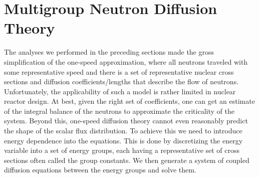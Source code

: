 \section{Multigroup Neutron Diffusion Theory}

The analyses we performed in the preceding sections made the gross simplification of the one-speed approximation, where all neutrons traveled with some representative speed and there is a set of representative nuclear cross sections and diffusion coefficients/lengths that describe the flow of neutrons. Unfortunately, the applicability of such a model is rather limited in nuclear reactor design. At best, given the right set of coefficients, one can get an estimate of the integral balance of the neutrons to approximate the criticality of the system. Beyond this, one-speed diffusion theory cannot even reasonably predict the shape of the scalar flux distribution. To achieve this we need to introduce energy dependence into the equations. This is done by discretizing the energy variable into a set of energy groups, each having a representative set of cross sections often called the group constants. We then generate a system of coupled diffusion equations between the energy groups and solve them.

